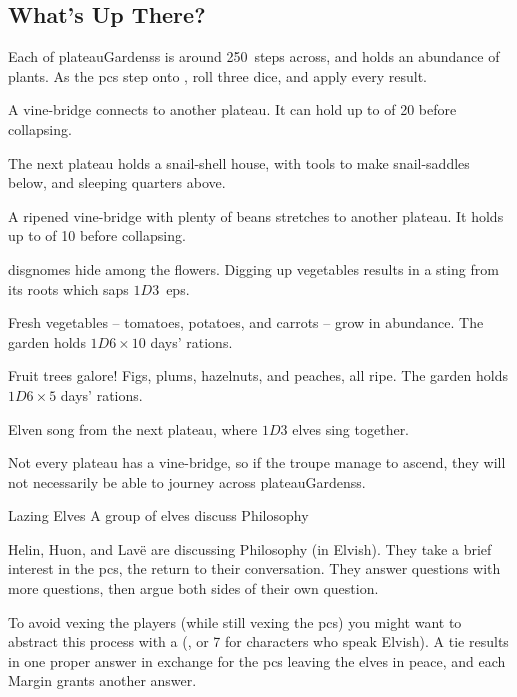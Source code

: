 \begin{multicols}{2}

\subsection{What's Up There?}

Each of \glspl{plateauGardens} is around 250~\glspl{step} across, and holds an abundance of plants.
As the \glspl{pc} step onto , roll three dice, and apply every result.

\begin{dlist}
  \item
  A vine-bridge connects to another plateau.
  It can hold up to  of 20 before collapsing.
  
  The next plateau holds a snail-shell house, with tools to make snail-saddles below, and sleeping quarters above.
  \item
  A ripened vine-bridge with plenty of beans stretches to another plateau.
  It holds up to  of 10 before collapsing.
  \item
  \Glspl{disgnome} hide among the flowers.
  Digging up vegetables results in a sting from its roots which saps $1D3$~\glspl{ep}.
  \item
  Fresh vegetables -- tomatoes, potatoes, and carrots -- grow in abundance.
  The garden holds $1D6 \times 10$ days' \glspl{ration}.
  \item
  Fruit trees galore!
  Figs, plums, hazelnuts, and peaches, all ripe.
  The garden holds $1D6 \times 5$ days' \glspl{ration}.
  \item
  Elven song from the next plateau, where $1D3$ elves sing together.
\end{dlist}

Not every plateau has a vine-bridge, so if the troupe manage to ascend, they will not necessarily be able to journey across \glspl{plateauGardens}.


{Lazing Elves}%
{A group of elves discuss Philosophy}%

Helin, Huon, and Lav\"e are discussing Philosophy (in Elvish).
They take a brief interest in the \glspl{pc}, the return to their conversation.
They answer questions with more questions, then argue both sides of their own question.

To avoid vexing the players (while still vexing the \glspl{pc}) you might want to abstract this process with a  (\tn[10], or 7 for characters who speak Elvish).
A tie results in one proper answer in exchange for the \glspl{pc} leaving the elves in peace, and each Margin grants another answer.


\end{multicols}
